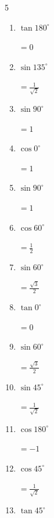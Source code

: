 \begin{multicols}{5}
\begin{enumerate}
        $\displaystyle =-\frac{1}{\sqrt{3}}$

  \item $\displaystyle \tan{180^\circ}$

        $\displaystyle =0$

  \item $\displaystyle \sin{135^\circ}$

        $\displaystyle =\frac{1}{\sqrt{2}}$

  \item $\displaystyle \sin{90^\circ}$

        $\displaystyle =1$

  \item $\displaystyle \cos{0^\circ}$

        $\displaystyle =1$

  \item $\displaystyle \sin{90^\circ}$

        $\displaystyle =1$

\columnbreak %

  \item $\displaystyle \cos{60^\circ}$

        $\displaystyle =\frac{1}{2}$

  \item $\displaystyle \sin{60^\circ}$

        $\displaystyle =\frac{\sqrt{3}}{2}$

  \item $\displaystyle \tan{0^\circ}$

        $\displaystyle =0$

  \item $\displaystyle \sin{60^\circ}$

        $\displaystyle =\frac{\sqrt{3}}{2}$

  \item $\displaystyle \sin{45^\circ}$

        $\displaystyle =\frac{1}{\sqrt{2}}$

  \item $\displaystyle \cos{180^\circ}$

        $\displaystyle =-1$

  \item $\displaystyle \cos{45^\circ}$

        $\displaystyle =\frac{1}{\sqrt{2}}$

  \item $\displaystyle \tan{45^\circ}$


\end{enumerate}
\end{multicols}
